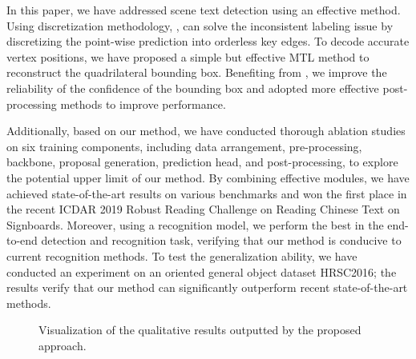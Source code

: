 In this paper, we have addressed \multioriented scene text detection using an effective \Ours method. Using discretization methodology, \Ours, can solve the inconsistent labeling issue by discretizing the point-wise prediction into orderless key edges. To decode accurate vertex positions, we have proposed a simple but effective MTL method to reconstruct the quadrilateral bounding box. Benefiting from \Ours, we improve the reliability of the confidence of the bounding box and adopted more effective post-processing methods to improve performance.

Additionally, based on our method, we have conducted thorough ablation studies on six training components, including data arrangement, pre-processing, backbone, proposal generation, prediction head, and post-processing, to explore the potential upper limit of our method. By combining
effective modules, we have achieved state-of-the-art results on various benchmarks and won the first place in the recent ICDAR 2019 Robust Reading Challenge on Reading Chinese Text on Signboards. Moreover, using a recognition model, we perform the best in the end-to-end detection and recognition task, verifying that our method is conducive to current recognition methods. To test the generalization ability, we have conducted an experiment on an oriented general object dataset HRSC2016; the results verify that our method can significantly outperform recent state-of-the-art methods.



\small 



   



\begin{figure*}[t!]
    \centering
    \caption{Visualization of the qualitative results outputted by the proposed approach.}
    \label{fig:my_label}
\end{figure*}


